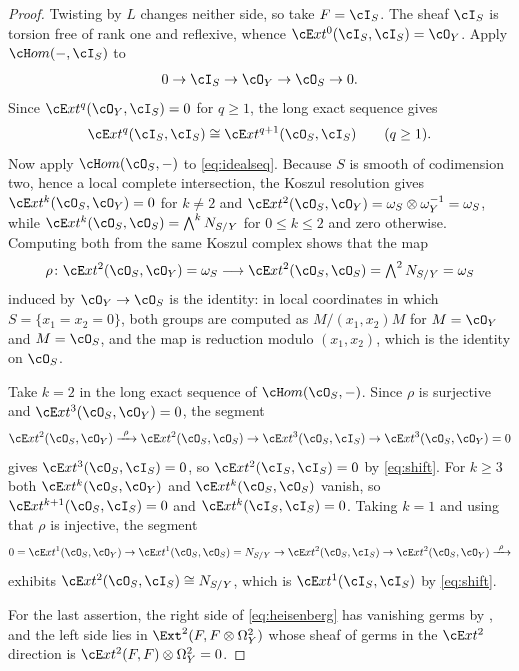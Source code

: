 \begin{proof}
Twisting by $L$ changes neither side, so take $F=\cI_{S}$. The sheaf
$\cI_{S}$ is torsion free of rank one and reflexive, whence
$\cE xt^{0}(\cI_{S},\cI_{S})=\cO_{Y}$. Apply $\cH om(-,\cI_{S})$ to
\begin{equation}\label{eq:idealseq}
  0\to\cI_{S}\to\cO_{Y}\to\cO_{S}\to0 .
\end{equation}
Since $\cE xt^{q}(\cO_{Y},\cI_{S})=0$ for $q\ge1$, the long exact sequence
gives
\begin{equation}\label{eq:shift}
  \cE xt^{q}(\cI_{S},\cI_{S})\cong\cE xt^{q+1}(\cO_{S},\cI_{S})
  \qquad(q\ge1).
\end{equation}
Now apply $\cH om(\cO_{S},-)$ to \eqref{eq:idealseq}. Because $S$ is smooth of
codimension two, hence a local complete intersection, the Koszul resolution
gives $\cE xt^{k}(\cO_{S},\cO_{Y})=0$ for $k\ne2$ and
$\cE xt^{2}(\cO_{S},\cO_{Y})=\omega_{S}\otimes\omega_{Y}^{-1}=\omega_{S}$,
while $\cE xt^{k}(\cO_{S},\cO_{S})=\bigwedge^{k}N_{S/Y}$ for $0\le k\le2$ and
zero otherwise. Computing both from the same Koszul complex shows that the
map
\[
  \rho\colon\cE xt^{2}(\cO_{S},\cO_{Y})=\omega_{S}
  \longrightarrow
  \cE xt^{2}(\cO_{S},\cO_{S})=\textstyle\bigwedge^{2}N_{S/Y}=\omega_{S}
\]
induced by $\cO_{Y}\to\cO_{S}$ is the identity: in local coordinates in which
$S=\{x_{1}=x_{2}=0\}$, both groups are computed as $M/(x_{1},x_{2})M$ for
$M=\cO_{Y}$ and $M=\cO_{S}$, and the map is reduction modulo $(x_{1},x_{2})$,
which is the identity on $\cO_{S}$.

Take $k=2$ in the long exact sequence of $\cH om(\cO_{S},-)$. Since $\rho$ is
surjective and $\cE xt^{3}(\cO_{S},\cO_{Y})=0$, the segment
\[
  \cE xt^{2}(\cO_{S},\cO_{Y})\xrightarrow{\ \rho\ }
  \cE xt^{2}(\cO_{S},\cO_{S})\to
  \cE xt^{3}(\cO_{S},\cI_{S})\to
  \cE xt^{3}(\cO_{S},\cO_{Y})=0
\]
gives $\cE xt^{3}(\cO_{S},\cI_{S})=0$, so $\cE xt^{2}(\cI_{S},\cI_{S})=0$ by
\eqref{eq:shift}. For $k\ge3$ both $\cE xt^{k}(\cO_{S},\cO_{Y})$ and
$\cE xt^{k}(\cO_{S},\cO_{S})$ vanish, so
$\cE xt^{k+1}(\cO_{S},\cI_{S})=0$ and $\cE xt^{k}(\cI_{S},\cI_{S})=0$. Taking
$k=1$ and using that $\rho$ is injective, the segment
\[
  0=\cE xt^{1}(\cO_{S},\cO_{Y})\to
  \cE xt^{1}(\cO_{S},\cO_{S})=N_{S/Y}\to
  \cE xt^{2}(\cO_{S},\cI_{S})\to
  \cE xt^{2}(\cO_{S},\cO_{Y})\xrightarrow{\ \rho\ }
\]
exhibits $\cE xt^{2}(\cO_{S},\cI_{S})\cong N_{S/Y}$, which is
$\cE xt^{1}(\cI_{S},\cI_{S})$ by \eqref{eq:shift}.

For the last assertion, the right side of \eqref{eq:heisenberg} has vanishing
germs by , and the left side lies in
$\Ext^{2}(F,F\otimes\Omega^{2}_{Y})$ whose sheaf of germs in the
$\cE xt^{2}$ direction is $\cE xt^{2}(F,F)\otimes\Omega^{2}_{Y}=0$.
\end{proof}

